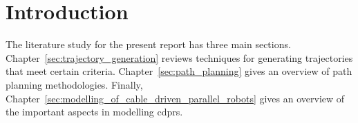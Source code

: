 \chapter{Introduction}%
\label{chap:introduction}





	The literature study for the present report has three main sections.
	Chapter~\ref{sec:trajectory_generation} reviews techniques for generating
	trajectories that meet certain criteria. Chapter~\ref{sec:path_planning}
	gives an overview of path planning methodologies. Finally,
	Chapter~\ref{sec:modelling_of_cable_driven_parallel_robots} gives an
	overview of the important aspects in modelling \glspl{cdpr}.

